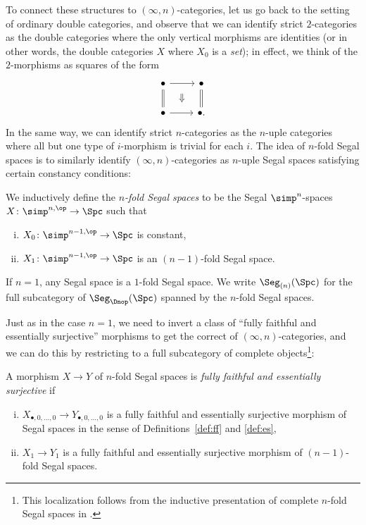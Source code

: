 \documentclass[a4paper,12pt]{article}
\begin{document}
To connect these structures to $(\infty,n)$-categories, let us go back
to the setting of ordinary double categories, and observe that we can
identify strict $2$-categories as the double categories where the only
vertical morphisms are identities (or in other words, the double
categories $X$ where $X_{0}$ is a \emph{set}); in effect, we think of
the $2$-morphisms as squares of the form
\[
  \begin{tikzcd}
    \bullet \ar[r] \ar[d, equals] \ar[dr, phantom, "\Downarrow"] &
    \bullet \ar[d, equals] \\
    \bullet \ar[r] & \bullet.
  \end{tikzcd}
\]
In the same way, we can identify strict $n$-categories as the $n$-uple
categories where all but one type of $i$-morphism is trivial for each
$i$. The idea of $n$-fold Segal spaces is to similarly identify
$(\infty,n)$-categories as $n$-uple Segal spaces satisfying certain
constancy conditions:
\begin{defn}
  We inductively define the \emph{$n$-fold Segal spaces} to be the
  Segal $\simp^{n}$-spaces $X \colon \simp^{n,\op} \to \Spc$ such that
  \begin{enumerate}[(i)]
  \item $X_{0} \colon \simp^{n-1,\op} \to \Spc$ is constant,
  \item $X_{1} \colon \simp^{n-1,\op} \to \Spc$ is an $(n-1)$-fold
    Segal space.
  \end{enumerate}
  If $n = 1$, any Segal space is a $1$-fold Segal space.  We write
  $\Seg_{(n)}(\Spc)$ for the full subcategory of $\Seg_{\Dnop}(\Spc)$
  spanned by the $n$-fold Segal spaces.
\end{defn}

Just as in the case $n = 1$, we need to invert a class of ``fully
faithful and essentially surjective'' morphisms to get the correct
\icat{} of $(\infty,n)$-categories, and we can do this by restricting
to a full subcategory of complete objects\footnote{This localization
  follows from the inductive presentation of complete $n$-fold Segal
  spaces in \cite{LurieGoodwillie}.}:
\begin{defn}
  A morphism $X \to Y$ of $n$-fold Segal spaces is \emph{fully
    faithful and essentially surjective} if
  \begin{enumerate}[(i)]
  \item $X_{\bullet,0,\dots,0} \to Y_{\bullet,0,\dots,0}$ is a fully
    faithful and essentially surjective morphism of Segal spaces in
    the sense of Definitions~\ref{def:ff} and \ref{def:es},
  \item $X_{1} \to Y_{1}$ is a fully faithful and essentially
    surjective morphism of $(n-1)$-fold Segal spaces.
  \end{enumerate}
\end{defn}
\end{document}
